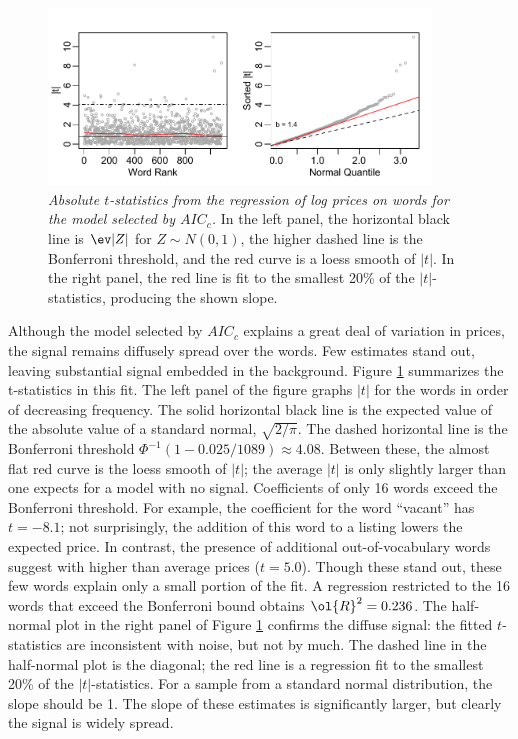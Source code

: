 \documentclass[12pt]{article}
\begin{document}
\begin{figure}
\caption{  \label{fig:aictstats}  
  {\sl Absolute $t$-statistics from the regression of log prices on words for the model selected by $AIC_c$.}  In the left panel, the horizontal black line is $\ev |Z|$ for $Z \sim N(0,1)$,  the higher dashed line is the Bonferroni threshold, and the red curve is a loess smooth of $|t|$.  In the right panel, the red line is fit to the smallest 20\% of the $|t|$-statistics, producing the shown slope.}
  \centerline{ \includegraphics[width=4in]{figures/aictstats.pdf} }
\end{figure}

 
Although the model selected by $AIC_c$ explains a great deal of variation in prices, the signal remains diffusely spread over the words.  Few estimates stand out, leaving substantial signal embedded in the background.   Figure \ref{fig:aictstats} summarizes the t-statistics in this fit. The left panel of the figure graphs $|t|$ for the words in order of decreasing frequency.  The solid horizontal black line is the expected value of the absolute value of a standard normal, $\sqrt{2/\pi}$. The dashed horizontal line is the Bonferroni threshold $\Phi^{-1}(1-0.025/1089) \approx 4.08$.  Between these, the almost flat red curve is the loess smooth of  $|t|$; the average $|t|$ is only slightly larger than one expects for a model with no signal.   Coefficients of only 16 words exceed the Bonferroni threshold.  For example,
 the coefficient for the word ``vacant'' has $t=-8.1$; not  surprisingly, the
 addition of this word to a listing lowers the expected price.  In
 contrast, the presence of additional out-of-vocabulary words
 suggest with higher than average prices ($t=5.0$).   Though these stand out, these few words explain only a small portion of the fit.  A regression restricted to the 16 words that exceed the Bonferroni bound obtains
 $\ol{R}^2 = 0.236$. The half-normal plot in the right panel of
 Figure \ref{fig:aictstats} confirms the diffuse signal: the fitted $t$-statistics are inconsistent with noise, but not by much.  The dashed line in the half-normal plot is the diagonal; the red
 line is a  regression fit to the smallest 20\% of the $|t|$-statistics.  For a sample from a standard normal distribution, the slope should be 1.  The slope of these estimates is significantly larger, but clearly the signal is
 widely spread.   
   
\end{document}
